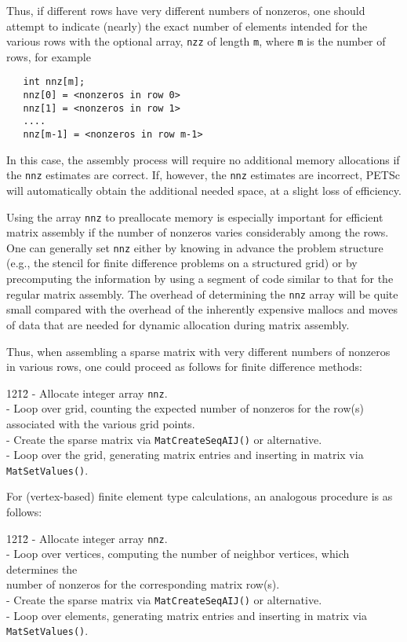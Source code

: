 Thus, if different rows have very different numbers of nonzeros, one
should attempt to indicate (nearly) the exact number of elements
intended for the various rows with the optional array, {\tt nzz} of
length {\tt m}, where {\tt m} is the number of rows, for example
\begin{verbatim}
   int nnz[m];
   nnz[0] = <nonzeros in row 0>
   nnz[1] = <nonzeros in row 1>
   ....
   nnz[m-1] = <nonzeros in row m-1>
\end{verbatim}
In this case, the assembly process will require no additional memory
allocations if the {\tt nnz} estimates are correct. If, however,
the {\tt nnz} estimates are incorrect, PETSc will automatically
obtain the additional needed space, at a slight loss of efficiency.

Using the array {\tt nnz} to preallocate memory is especially
important for efficient matrix assembly if the number of nonzeros
varies considerably among the rows.  One can generally set {\tt nnz}
either by knowing in advance the problem structure (e.g., the stencil
for finite difference problems on a structured grid) or by
precomputing the information by using a segment of code similar to
that for the regular matrix assembly.  The overhead of determining the
{\tt nnz} array will be quite small compared with the overhead of the
inherently expensive mallocs and moves of data that are needed for
dynamic allocation during matrix assembly.

Thus, when assembling a sparse matrix with very different
numbers of nonzeros in various rows, one could proceed 
as follows for finite difference methods:
\begin{tabbing}
12\=12\= \kill
    \> - Allocate integer array {\tt nnz}.\\
    \> - Loop over grid, counting the expected number of nonzeros for the row(s)\\
    \>\>  associated with the various grid points.\\
    \> - Create the sparse matrix via {\tt MatCreateSeqAIJ()} or alternative.\\
    \> - Loop over the grid, generating matrix entries and inserting 
      in matrix via {\tt MatSetValues()}.\\
  \end{tabbing}
\vspace{-0.2in}
For (vertex-based) finite element type calculations, an analogous procedure is as follows:
  \begin{tabbing}
12\=12\= \kill
    \> - Allocate integer array {\tt nnz}.\\
    \>- Loop over vertices, computing the number of neighbor vertices, which determines the\\
    \>\> number of nonzeros for the corresponding matrix row(s).\\
    \> - Create the sparse matrix via {\tt MatCreateSeqAIJ()} or alternative.\\
    \> - Loop over elements, generating matrix entries and inserting
      in matrix via {\tt MatSetValues()}.\\
  \end{tabbing}

